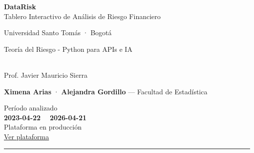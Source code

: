 \documentclass[10pt,a4paper]{article}
\begin{document}

\thispagestyle{empty}
\vspace*{-0.5cm}

\noindent
\begin{minipage}[c]{0.62\textwidth}
  {\fontsize{22}{26}\selectfont\bfseries\color{dark}DataRisk}\\[2pt]
  {\large\color{primary}Tablero Interactivo de Análisis de Riesgo Financiero}\\[6pt]
  {\small\color{textgray}Universidad Santo Tomás · Bogotá
   
   Teoría del Riesgo \quad - \quad Python para APIs e IA}\\
  {\small\color{textgray}Prof. Javier Mauricio Sierra}
  {\small\color{dark}\quad
  
  \textcolor{primary}{\textbf{Ximena Arias}} \textcolor{bordergray}{·}
  \textcolor{primary}{\textbf{Alejandra Gordillo}}
  \quad\textcolor{textgray}{\small — \quad  Facultad de Estadística}}
\end{minipage}%
\hfill
\begin{minipage}[c]{0.35\textwidth}
  \raggedleft
    {\footnotesize\color{textgray}Período analizado}\\[2pt]
    {\small\bfseries\color{dark}2023-04-22 ~ 2026-04-21}\\[4pt]
    {\footnotesize\color{textgray}Plataforma en producción}\\[1pt]
    {\scriptsize\color{primary}\href{https://proyecto-teoria-python-aleja-xime.streamlit.app/}{Ver plataforma}}
\end{minipage}

\vspace{4pt}
\color{bordergray}\rule{\linewidth}{0.6pt}\color{black}
\vspace{2pt}
\end{document}
